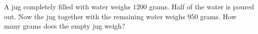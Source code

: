 A jug completely filled with water weighs $1200$ grams. Half of the water is poured out. Now the jug together with the remaining water weighs $950$ grams. How many grams does the empty jug weigh?
